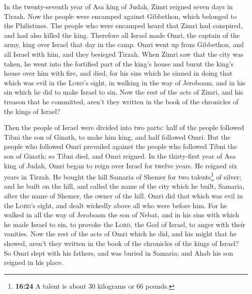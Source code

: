  In the twenty-seventh year of Asa king of Judah, Zimri
reigned seven days in Tirzah. Now the people were encamped against
Gibbethon, which belonged to the Philistines.  The people
who were encamped heard that Zimri had conspired, and had also killed
the king. Therefore all Israel made Omri, the captain of the army, king
over Israel that day in the camp.  Omri went up from
Gibbethon, and all Israel with him, and they besieged Tirzah.
 When Zimri saw that the city was taken, he went into the
fortified part of the king's house and burnt the king's house over him
with fire, and died,  for his sins which he sinned in
doing that which was evil in the \textsc{Lord}'s sight, in walking in
the way of Jeroboam, and in his sin which he did to make Israel to sin.
 Now the rest of the acts of Zimri, and his treason that
he committed, aren't they written in the book of the chronicles of the
kings of Israel?

 Then the people of Israel were divided into two parts:
half of the people followed Tibni the son of Ginath, to make him king,
and half followed Omri.  But the people who followed Omri
prevailed against the people who followed Tibni the son of Ginath; so
Tibni died, and Omri reigned.  In the thirty-first year
of Asa king of Judah, Omri began to reign over Israel for twelve years.
He reigned six years in Tirzah.  He bought the hill
Samaria of Shemer for two talents\footnote{\textbf{16:24} A talent is
  about 30 kilograms or 66 pounds.} of silver; and he built on the hill,
and called the name of the city which he built, Samaria, after the name
of Shemer, the owner of the hill.  Omri did that which
was evil in the \textsc{Lord}'s sight, and dealt wickedly above all who
were before him.  For he walked in all the way of
Jeroboam the son of Nebat, and in his sins with which he made Israel to
sin, to provoke the \textsc{Lord}, the God of Israel, to anger with
their vanities.  Now the rest of the acts of Omri which
he did, and his might that he showed, aren't they written in the book of
the chronicles of the kings of Israel?  So Omri slept
with his fathers, and was buried in Samaria; and Ahab his son reigned in
his place.

